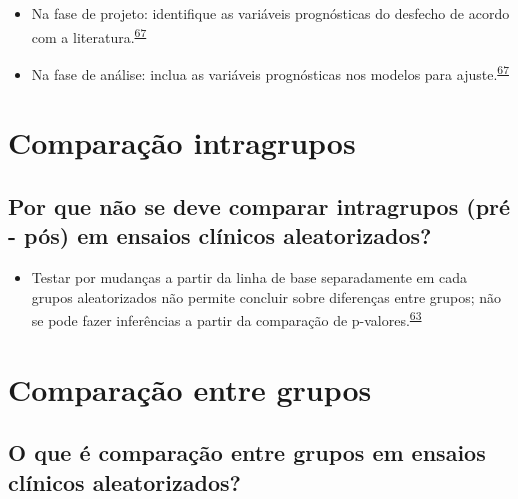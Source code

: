 \documentclass[
]{book}
\providecommand{\tightlist}{%
  \setlength{\itemsep}{0pt}\setlength{\parskip}{0pt}}
\begin{document}
\begin{itemize}
\item
  Na fase de projeto: identifique as variáveis prognósticas do desfecho de acordo com a literatura.\textsuperscript{\protect\hyperlink{ref-roberts1999}{67}}
\item
  Na fase de análise: inclua as variáveis prognósticas nos modelos para ajuste.\textsuperscript{\protect\hyperlink{ref-roberts1999}{67}}
\end{itemize}

\hypertarget{comparacao-intragrupos}{%
\section{Comparação intragrupos}\label{comparacao-intragrupos}}

\hypertarget{por-que-nuxe3o-se-deve-comparar-intragrupos-pruxe9---puxf3s-em-ensaios-cluxednicos-aleatorizados}{%
\subsection{Por que não se deve comparar intragrupos (pré - pós) em ensaios clínicos aleatorizados?}\label{por-que-nuxe3o-se-deve-comparar-intragrupos-pruxe9---puxf3s-em-ensaios-cluxednicos-aleatorizados}}

\begin{itemize}
\tightlist
\item
  Testar por mudanças a partir da linha de base separadamente em cada grupos aleatorizados não permite concluir sobre diferenças entre grupos; não se pode fazer inferências a partir da comparação de p-valores.\textsuperscript{\protect\hyperlink{ref-bland2011}{63}}
\end{itemize}

\hypertarget{comparacao-entre-grupos}{%
\section{Comparação entre grupos}\label{comparacao-entre-grupos}}

\hypertarget{o-que-uxe9-comparauxe7uxe3o-entre-grupos-em-ensaios-cluxednicos-aleatorizados}{%
\subsection{O que é comparação entre grupos em ensaios clínicos aleatorizados?}\label{o-que-uxe9-comparauxe7uxe3o-entre-grupos-em-ensaios-cluxednicos-aleatorizados}}
\end{document}
